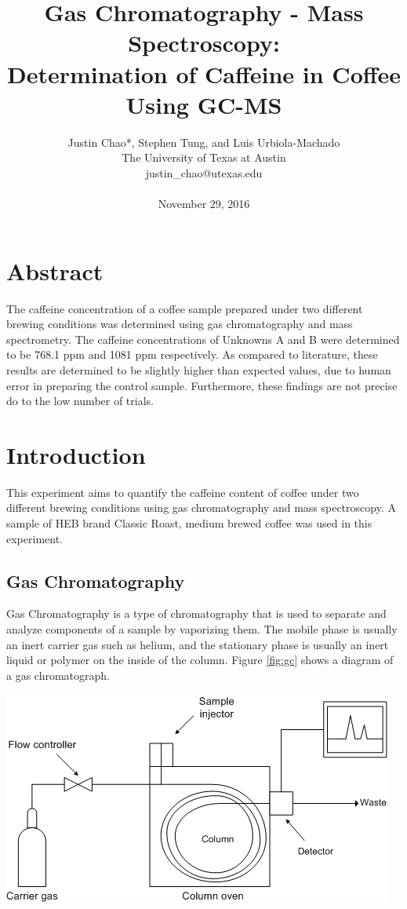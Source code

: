 \documentclass{article}
\title{Gas Chromatography - Mass Spectroscopy: \\
Determination of Caffeine in Coffee Using GC-MS}
\author{{Justin Chao*, Stephen Tung, and Luis Urbiola-Machado}\\[2ex]
The University of Texas at Austin \\ 
justin\_chao@utexas.edu \\ \\
November 29, 2016}
\date{}
\newenvironment{nscenter}
    {\parskip=0pt\par\nopagebreak\centering}
    {\par\noindent\ignorespacesafterend}
\begin{document}
\maketitle
\unskip\vspace{1.5\baselineskip}


\begin{multicols}{2}

{\fontsize{9.5}{12}\selectfont   

\section*{Abstract} 
The caffeine concentration of a coffee sample prepared under two different
    brewing conditions was determined using gas chromatography and mass
    spectrometry.
    The caffeine concentrations of Unknowns A and B were determined to be 768.1
    ppm and 1081 ppm respectively.
    As compared to literature, these results are determined to be slightly
    higher than expected values, due to human error in preparing the control
    sample.
    Furthermore, these findings are not precise do to the low number of trials.

\section*{Introduction}
This experiment aims to quantify the caffeine content of coffee under two
different brewing conditions using gas chromatography and mass spectroscopy. 
A sample of HEB brand Classic Roast, medium brewed
coffee was used in this experiment.

\subsection*{Gas Chromatography}
Gas Chromatography is a type of chromatography that is used to separate and
analyze components of a sample by vaporizing them. The mobile phase is
usually an inert carrier gas such as helium, and the stationary phase is
usually an inert liquid or polymer on the inside of the column. \cite{Harris}
Figure \ref{fig:gc} shows a diagram of a gas chromatograph.

\begin{nscenter}
    \includegraphics[scale=0.35]{gc.png}
    \label{fig:gc} 
\end{nscenter}

}
\end{multicols}
\end{document}
